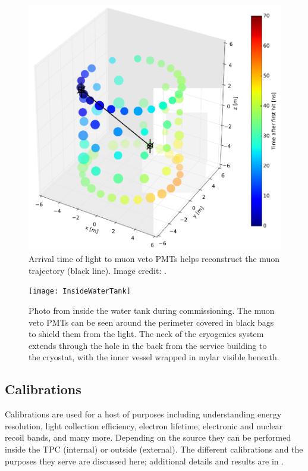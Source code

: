 \begin{figure}
\centering
\includegraphics[width=\textwidth]{MuonVetoEvent}
\caption{Arrival time of light to muon veto PMTs helps reconstruct the muon trajectory (black line).  Image credit:
.}
\label{fig:xenon1t_water_shield_photo}
\end{figure}

\begin{figure}
\centering
\texttt{[image: InsideWaterTank]}
\caption[Photo from inside the water tank during commissioning.]{Photo from inside the water tank during commissioning.  The muon veto PMTs
can be seen around the perimeter covered in black bags to shield them from the
light.  The neck of the cryogenics system extends through the hole in the back from the service building to the cryostat, with the
inner vessel wrapped in mylar visible beneath.}
\label{fig:xenon1t_water_shield_interior}
\end{figure}



\subsection{Calibrations}
\label{subsec:xenon1t_calibrations}
Calibrations are used for a host of purposes including understanding energy resolution, light collection efficiency, electron lifetime,
electronic and nuclear recoil bands, and many more.  Depending on the source they can be performed inside the TPC (internal)
or outside (external).  The different calibrations and the purposes they serve are discussed here; additional details and results are in
.

